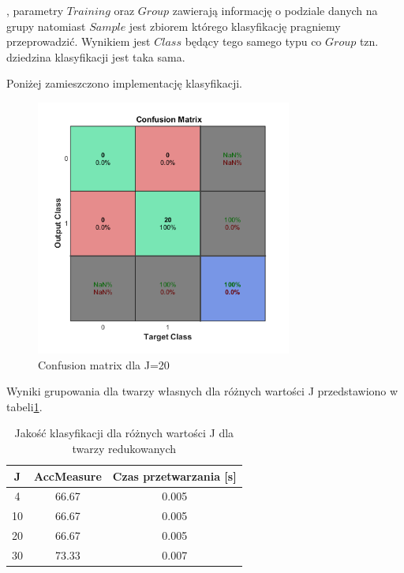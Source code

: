 \documentclass[11pt, a4paper]{article}
\newcommand{\fbi}{\leavevmode{\parindent=1em\indent}}
\begin{document}
, parametry $Training$ oraz $Group$ zawierają informację o podziale danych na grupy natomiast $Sample$ jest zbiorem którego klasyfikację pragniemy przeprowadzić. Wynikiem jest $Class$ będący tego samego typu co $Group$ tzn. dziedzina klasyfikacji jest taka sama.

Poniżej zamieszczono implementację klasyfikacji.




\begin{figure}[H]
	\centering
	\includegraphics[width=0.75\textwidth]{./assets/ilustracja_zad2_conf_j20.png}
	\caption{Confusion matrix dla J=20}
	\label{fig:ilustracja_zad2_conf_j20}
\end{figure}


\fbi
Wyniki grupowania dla twarzy własnych dla różnych wartości J przedstawiono w tabeli\ref{tab:wynikiKlasyfikacjaRedukowane}.

\begin{table}[H]
	\centering
	\caption{Jakość klasyfikacji dla różnych wartości J dla twarzy redukowanych}
	\begin{tabular}{|c|c|c|}
		\hline 
		J & AccMeasure & Czas przetwarzania [s] \\ 
		\hline
		4 & 66.67 & 0.005 \\
		\hline
		10 & 66.67 & 0.005 \\
		\hline
		20 & 66.67 & 0.005 \\
		\hline
		30 & 73.33 & 0.007 \\
		\hline
	\end{tabular}
	\label{tab:wynikiKlasyfikacjaRedukowane}
\end{table}
\end{document}
